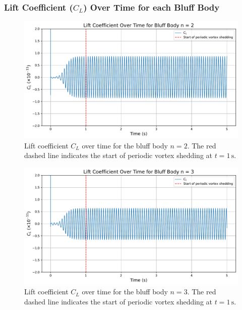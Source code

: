 \subsubsection{Lift Coefficient ($C_L$) Over Time for each Bluff Body}
\label{sec:C_LvsTime}

\begin{figure}[H]
	\centering
	\includegraphics[width=\textwidth]{images/2face_graph}
	\caption{Lift coefficient $C_L$ over time for the bluff body $n=2$. The red dashed line indicates the start of periodic vortex shedding at $t = 1\,\mathrm{s}$.}
	\label{fig:2FaceGraph}
\end{figure}

\begin{figure}[H]
	\centering
	\includegraphics[width=\textwidth]{images/3face_graph}
	\caption{Lift coefficient $C_L$ over time for the bluff body $n=3$. The red dashed line indicates the start of periodic vortex shedding at $t = 1\,\mathrm{s}$.}
	\label{fig:3FaceGraph} 
\end{figure}

